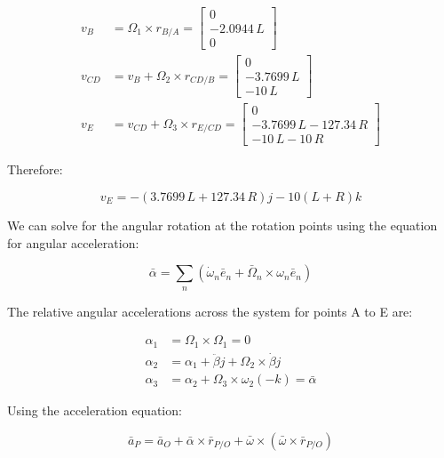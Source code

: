 \documentclass[12pt, letterpaper]{../assignment}
\begin{document}
\begin{equation*}
    \begin{aligned}
        v_B &= \Omega_1 \times r_{B/A} = \left[\begin{array}{c} 0\\ -2.0944\,L\\ 0 \end{array}\right] \\
        v_{CD} &= v_B + \Omega_2 \times r_{CD/B} = \left[\begin{array}{c} 0\\ -3.7699\,L\\ -10\,L \end{array}\right] \\
        v_E &= v_{CD} + \Omega_3 \times r_{E/CD} = \left[\begin{array}{c} 0\\ -3.7699\,L-127.34\,R\\ -10\,L-10\,R \end{array}\right]
    \end{aligned}
\end{equation*}

Therefore:

\begin{answer}
$$ v_E =   -\left(3.7699\,L+127.34\,R\right) j - 10\left(L+R \right)k $$
\end{answer}

We can solve for the angular rotation at the rotation points using the equation for angular acceleration:

$$ \bar{\alpha} =
\sum_n \left( \dot{\omega}_n \bar{e}_n + \bar{\Omega}_n \times \omega_n \bar{e}_n \right) $$

The relative angular accelerations across the system for points A to E are:

\begin{equation*}
\begin{aligned}
\alpha_1 &= \Omega_1 \times \Omega_1 = 0\\
\alpha_2 &= \alpha_1 + \ddot{\beta} j + \Omega_2 \times \dot{\beta} j\\
\alpha_3 &= \alpha_2 + \Omega_3 \times \omega_2(-k) = \bar{\alpha} %
\end{aligned}
\end{equation*}

Using the acceleration equation:

$$ \bar{a}_P = \bar{a}_O + \bar{\alpha} \times \bar{r}_{P/O} + \bar{\omega} \times \left( \bar{\omega} \times \bar{r}_{P/O} \right)$$
\end{document}
